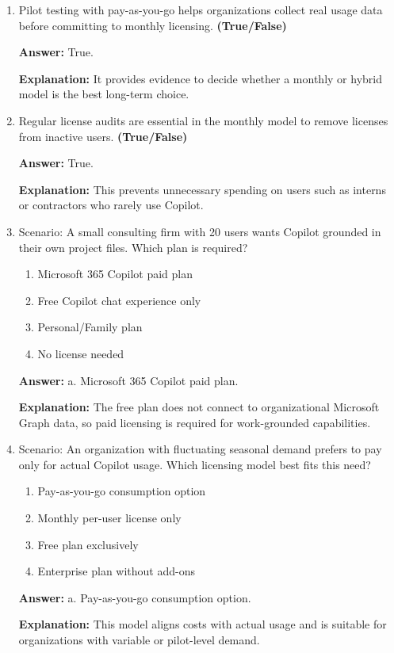 \documentclass[10pt]{article}
\begin{document}
\begin{enumerate}[leftmargin=*]
\textbf{Answer:} True.

\textbf{Explanation:} Admins must plan for these scenarios with budget alerts and workload tagging.

\item Pilot testing with pay-as-you-go helps organizations collect real usage data before committing to monthly licensing. \textbf{(True/False)}

\textbf{Answer:} True.

\textbf{Explanation:} It provides evidence to decide whether a monthly or hybrid model is the best long-term choice.

\item Regular license audits are essential in the monthly model to remove licenses from inactive users. \textbf{(True/False)}

\textbf{Answer:} True.

\textbf{Explanation:} This prevents unnecessary spending on users such as interns or contractors who rarely use Copilot.

\item Scenario: A small consulting firm with 20 users wants Copilot grounded in their own project files. Which plan is required?
\begin{enumerate}[label=\alph*., leftmargin=1.5em]
\item Microsoft 365 Copilot paid plan
\item Free Copilot chat experience only
\item Personal/Family plan
\item No license needed
\end{enumerate}
\textbf{Answer:} a. Microsoft 365 Copilot paid plan.

\textbf{Explanation:} The free plan does not connect to organizational Microsoft Graph data, so paid licensing is required for work-grounded capabilities.

\item Scenario: An organization with fluctuating seasonal demand prefers to pay only for actual Copilot usage. Which licensing model best fits this need?
\begin{enumerate}[label=\alph*., leftmargin=1.5em]
\item Pay-as-you-go consumption option
\item Monthly per-user license only
\item Free plan exclusively
\item Enterprise plan without add-ons
\end{enumerate}
\textbf{Answer:} a. Pay-as-you-go consumption option.

\textbf{Explanation:} This model aligns costs with actual usage and is suitable for organizations with variable or pilot-level demand.

\end{enumerate}
\clearpage
\end{document}
